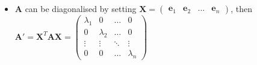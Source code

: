 \documentclass[fleqn]{article}
\begin{document}
\begin{enumerate}
\begin{itemize}[label={--}, topsep=0pt]
            \item $\bm{A}$ can be diagonalised by setting $\bm{X}=\begin{pmatrix}
                    \bm{e}_1 & \bm{e}_2 & \dots & \bm{e}_n
                \end{pmatrix}$, then \smallbreak
                $\bm{A}'=\bm{X}^T\bm{AX}=
                \begin{pmatrix}
                    \lambda_1 & 0 & \dots & 0\\
                    0 & \lambda_2 & \dots & 0\\
                    \vdots & \vdots & \ddots & \vdots\\
                    0 & 0 & \dots & \lambda_n 
                \end{pmatrix}$
        \end{itemize}
\end{enumerate}
\end{document}
